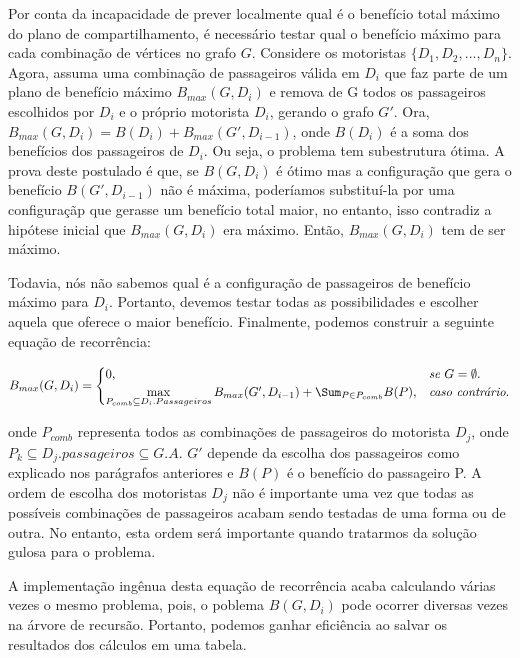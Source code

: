 \documentclass{article}
\begin{document}
Por conta da incapacidade de prever localmente qual é o benefício total máximo do plano de compartilhamento, é necessário testar 
qual o benefício máximo para cada combinação de vértices no grafo $ G $. Considere os motoristas $ \{ D_1, D_2, ..., D_n \} $.
Agora, assuma uma combinação de passageiros válida em $ D_i $ que faz parte de um plano de benefício máximo $ B_{max}(G, D_i) $ 
e remova de G todos os passageiros escolhidos por $ D_i $ e o próprio motorista $ D_i $, gerando o grafo $ G' $. Ora,
$ B_{max}(G, D_{i}) = B(D_i) + B_{max}(G', D_{i - 1}) $, onde $ B(D_i) $ é a soma dos benefícios dos passageiros de $ D_i $.
Ou seja, o problema tem subestrutura ótima. A prova deste postulado é que, se $ B(G, D_{i}) $ é ótimo mas a configuração que gera
o benefício $ B(G', D_{i - 1}) $ não é máxima, poderíamos substituí-la por uma configuraçãp que gerasse um benefício total
maior, no entanto, isso contradiz a hipótese inicial que $ B_{max}(G, D_{i}) $ era máximo. Então, $ B_{max}(G, D_{i}) $ tem de ser
máximo.

Todavia, nós não sabemos qual é a configuração de passageiros de benefício máximo para $ D_i $. Portanto, devemos testar
todas as possibilidades e escolher aquela que oferece o maior benefício. Finalmente, podemos construir a seguinte equação 
de recorrência:

\begin{equation}
  B_{max}(G, D_i) = 
  \begin{cases}
    0, & \textit{se $ G = \emptyset $}.\\
    \max\limits_{P_{comb} \subseteq D_i.Passageiros} B_{max}(G', D_{i-1}) + \Sum_{P \in P_{comb}} B(P), & \textit{caso contrário}.\\
  \end{cases}
\end{equation}

onde $ P_{comb} $ representa todos as combinações de passageiros do motorista $ D_j $, onde $ P_k \subseteq D_j.passageiros \subseteq G.A $.
$ G' $ depende da escolha dos passageiros como explicado nos parágrafos anteriores e $ B(P) $ é o benefício do passageiro P.
A ordem de escolha dos motoristas $ D_j $ não é importante uma vez que todas as possíveis combinações de
passageiros acabam sendo testadas de uma forma ou de outra. No entanto, esta ordem será importante quando tratarmos da solução gulosa para o problema.

A implementação ingênua desta equação de recorrência acaba calculando várias vezes o mesmo problema, pois, o poblema $ B(G, D_i) $ 
pode ocorrer diversas vezes na árvore de recursão. Portanto, podemos ganhar eficiência ao
salvar os resultados dos cálculos em uma tabela.
\end{document}
